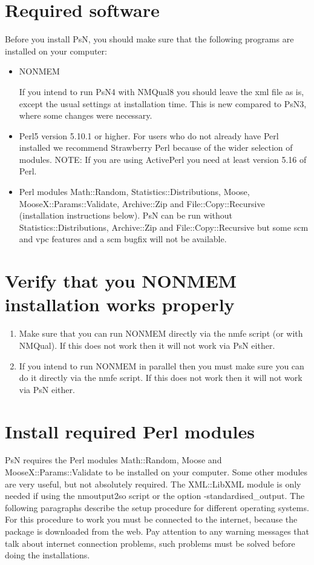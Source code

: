 


\maketitle

\section{Required software}
Before you install PsN, you should make sure that the following programs are installed on your computer:
\begin{itemize}
\item NONMEM 

If you intend to run PsN4 with NMQual8 you should leave the xml file as is, except the usual settings at installation time. 
This is new compared to PsN3, where some changes were necessary.
	\item Perl5 version 5.10.1 or higher. For users who do not already have Perl
installed we recommend Strawberry Perl because of the wider selection of modules.
NOTE: If you are using ActivePerl you need at least version 5.16 of Perl.
	\item Perl modules Math::Random, Statistics::Distributions, Moose, MooseX::Params::Validate, Archive::Zip and File::Copy::Recursive (installation instructions below). PsN can be run without Statistics::Distributions, Archive::Zip and File::Copy::Recursive but some scm and vpc features and a scm bugfix will not be available.
\end{itemize}

\section{Verify that you NONMEM installation works properly}
\begin{enumerate}
\item Make sure that you can run NONMEM directly via the nmfe script (or with NMQual). If this does not work then it will not work via PsN either.
\item If you intend to run NONMEM in parallel then you must make sure you can do it directly via the nmfe script. If this does not work then it will not work via PsN either.
\end{enumerate}

\section{Install required Perl modules}
PsN requires the Perl modules Math::Random, Moose and MooseX::Params::Validate to be installed on your computer. Some other modules are very useful, but not absolutely required. The XML::LibXML module is only needed if using the nmoutput2so script or the option -standardised\_output. The following paragraphs describe the setup procedure for different operating systems. For this procedure to work you must be connected to the internet, because the package is downloaded from the web. Pay attention to any warning messages that talk about internet connection problems, such problems must be solved before doing the installations.

